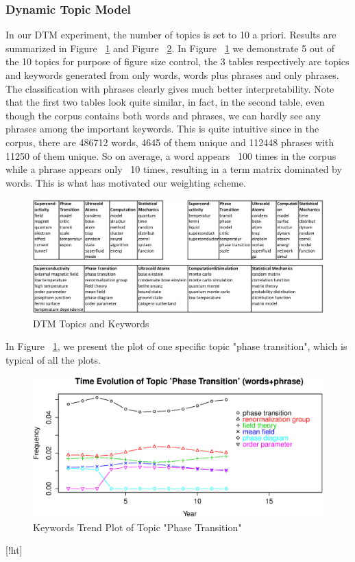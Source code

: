 \documentclass[DIV=calc, paper=letter, fontsize=10pt, twocolumn]{scrartcl}	 %
\begin{document}
\subsubsection*{Dynamic Topic Model}
In our DTM experiment, the number of topics is set to 10 a priori. Results are summarized in Figure ~\ref{fig: DTM_table_unweight} and Figure ~\ref{fig: PhaseTrans_wp}. In Figure ~\ref{fig: DTM_table_unweight} we demonstrate 5 out of the 10 topics for purpose of figure size control, the 3 tables respectively are topics and keywords generated from only words, words plus phrases and only phrases. The classification with phrases clearly gives much better interpretability. Note that the first two tables look quite similar, in fact, in the second table, even though the corpus contains both words and phrases, we can hardly see any phrases among the important keywords. This is quite intuitive since in the corpus, there are 486712 words, 4645 of them unique and 112448 phrases with 11250 of them unique. So on average, a word appears ~100 times in the corpus while a phrase appears only ~10 times, resulting in a term matrix dominated by words. This is what has motivated our weighting scheme. \begin{figure}[!ht]
  \includegraphics[scale = 0.45]{dtm10_unweight.eps}
  \caption{DTM Topics and Keywords}
  \label{fig: DTM_table_unweight}
\end{figure}
In Figure ~\ref{fig: DTM_table_unweight}, we present the plot of one specific topic "phase transition", which is typical of all the plots.
\begin{figure}[!ht]
  \includegraphics[scale = 0.365]{PhaseTrans(w_p).eps}
  \caption{Keywords Trend Plot of Topic "Phase Transition"}
  \label{fig: PhaseTrans_wp}
\end{figure}[!ht]
\end{document}
